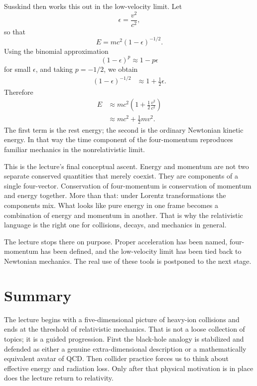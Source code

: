 Susskind then works this out in the low-velocity limit. Let
\begin{equation}
\epsilon = \frac{v^2}{c^2},
\end{equation}
so that
\begin{equation}
E = mc^2(1-\epsilon)^{-1/2}.
\end{equation}
Using the binomial approximation
\begin{equation}
(1-\epsilon)^p \approx 1-p\epsilon
\end{equation}
for small \(\epsilon\), and taking \(p=-1/2\), we obtain
\begin{align}
(1-\epsilon)^{-1/2}
&\approx 1+\frac{1}{2}\epsilon.
\end{align}
Therefore
\begin{align}
E
&\approx mc^2\left(1+\frac{1}{2}\frac{v^2}{c^2}\right) \\
&\approx mc^2 + \frac{1}{2}mv^2.
\end{align}
The first term is the rest energy; the second is the ordinary Newtonian kinetic energy. In that way the time component of the four-momentum reproduces familiar mechanics in the nonrelativistic limit.

This is the lecture's final conceptual ascent. Energy and momentum are not two separate conserved quantities that merely coexist. They are components of a single four-vector. Conservation of four-momentum is conservation of momentum and energy together. More than that: under Lorentz transformations the components mix. What looks like pure energy in one frame becomes a combination of energy and momentum in another. That is why the relativistic language is the right one for collisions, decays, and mechanics in general.

The lecture stops there on purpose. Proper acceleration has been named, four-momentum has been defined, and the low-velocity limit has been tied back to Newtonian mechanics. The real use of these tools is postponed to the next stage.

\section{Summary}

The lecture begins with a five-dimensional picture of heavy-ion collisions and ends at the threshold of relativistic mechanics. That is not a loose collection of topics; it is a guided progression. First the black-hole analogy is stabilized and defended as either a genuine extra-dimensional description or a mathematically equivalent avatar of QCD. Then collider practice forces us to think about effective energy and radiation loss. Only after that physical motivation is in place does the lecture return to relativity.

